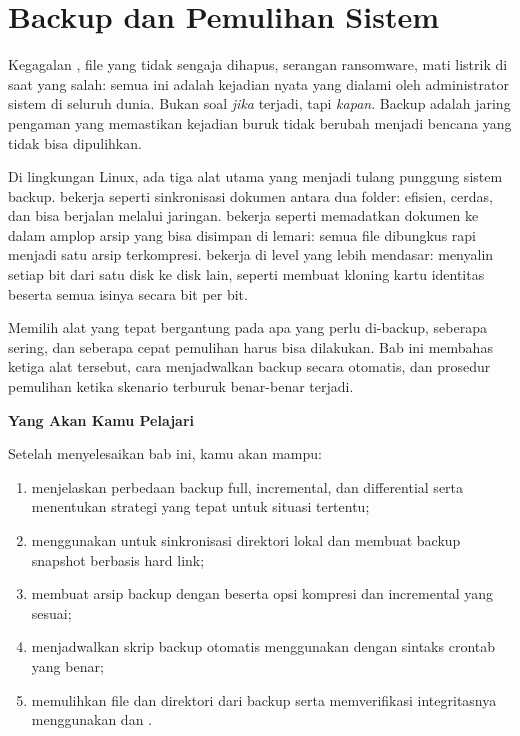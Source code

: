 
\chapter{Backup dan Pemulihan Sistem}
\label{ch:backup-and-recovery}


Kegagalan , file yang tidak sengaja dihapus, serangan ransomware, mati
listrik di saat yang salah: semua ini adalah kejadian nyata yang dialami oleh
administrator sistem di seluruh dunia. Bukan soal \textit{jika} terjadi, tapi
\textit{kapan}. Backup adalah jaring pengaman yang memastikan kejadian buruk
tidak berubah menjadi bencana yang tidak bisa dipulihkan.

Di lingkungan Linux, ada tiga alat utama yang menjadi tulang punggung sistem
backup.  bekerja seperti sinkronisasi dokumen antara dua folder:
efisien, cerdas, dan bisa berjalan melalui jaringan.  bekerja seperti
memadatkan dokumen ke dalam amplop arsip yang bisa disimpan di lemari: semua
file dibungkus rapi menjadi satu arsip terkompresi.  bekerja di level
yang lebih mendasar: menyalin setiap bit dari satu disk ke disk lain, seperti
membuat kloning kartu identitas beserta semua isinya secara bit per bit.

Memilih alat yang tepat bergantung pada apa yang perlu di-backup, seberapa
sering, dan seberapa cepat pemulihan harus bisa dilakukan. Bab ini membahas
ketiga alat tersebut, cara menjadwalkan backup secara otomatis, dan prosedur
pemulihan ketika skenario terburuk benar-benar terjadi.

\textbf{Yang Akan Kamu Pelajari}

Setelah menyelesaikan bab ini, kamu akan mampu:

\begin{enumerate}
    \item menjelaskan perbedaan backup full, incremental, dan differential
        serta menentukan strategi yang tepat untuk situasi tertentu;
    \item menggunakan  untuk sinkronisasi direktori lokal dan membuat
        backup snapshot berbasis hard link;
    \item membuat arsip backup dengan  beserta opsi kompresi dan
        incremental yang sesuai;
    \item menjadwalkan skrip backup otomatis menggunakan  dengan
        sintaks crontab yang benar;
    \item memulihkan file dan direktori dari backup serta memverifikasi
        integritasnya menggunakan  dan .
\end{enumerate}

